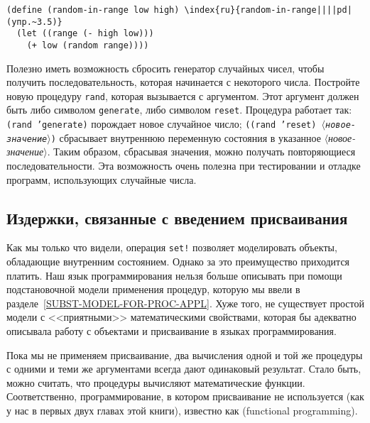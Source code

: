 \begin{exercise}{3.5}
\begin{Verbatim}[fontsize=\small]
(define (random-in-range low high) \index{ru}{random-in-range||||pd|(упр.~3.5)}
  (let ((range (- high low)))
    (+ low (random range))))
\end{Verbatim}
\end{exercise}

\begin{exercise}{3.6}\label{EX3.6}%
%
%
Полезно иметь
возможность сбросить генератор случайных
чисел, чтобы получить последовательность, которая начинается с некоторого
числа.  Постройте новую процедуру {\tt rand}, которая
вызывается с аргументом.  Этот аргумент должен быть либо символом
{\tt generate}, либо символом {\tt reset}.  Процедура
работает так: {\tt (rand 'generate)} порождает новое случайное
число; {\tt ((rand 'reset) \textit{$\langle$новое-значение$\rangle$})}
сбрасывает внутреннюю переменную состояния в указанное
\textit{$\langle$новое-значение$\rangle$}. Таким образом, сбрасывая значения,
можно получать повторяющиеся последовательности.  Эта возможность
очень полезна при тестировании и отладке программ,
использующих случайные числа.
\end{exercise}


\subsection{Издержки, связанные с введением присваивания}
\label{THE-COSTS-OF-INTRODUCING-ASSIGNMENT}


Как мы только что видели, операция
{\tt set!} позволяет моделировать объекты, обладающие
внутренним состоянием.  Однако за это преимущество приходится
 платить.
Наш язык программирования нельзя больше описывать при помощи
подстановочной модели применения процедур, которую мы ввели в
разделе~\ref{SUBST-MODEL-FOR-PROC-APPL}.  Хуже того, не существует
простой модели с <<приятными>> математическими свойствами, которая бы
адекватно описывала работу с объектами и присваивание в
языках программирования.

Пока мы не применяем присваивание, два вычисления одной и
той же процедуры с одними и теми же аргументами всегда дают одинаковый
результат. Стало быть, можно считать, что процедуры вычисляют
математические функции.  Соответственно, программирование, в котором
присваивание не используется (как у нас в первых
двух главах этой книги), известно как
 (functional programming).

